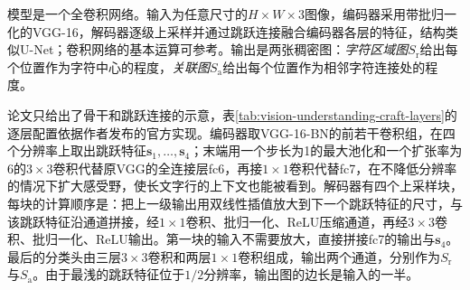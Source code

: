 模型是一个全卷积网络。输入为任意尺寸的$H\times W\times3$图像，编码器采用带批归一化的VGG-16，解码器逐级上采样并通过跳跃连接融合编码器各层的特征，结构类似U-Net；卷积网络的基本运算可参考。输出是两张稠密图：\emph{字符区域图}$S_{\mathrm r}$给出每个位置作为字符中心的程度，\emph{关联图}$S_{\mathrm a}$给出每个位置作为相邻字符连接处的程度。

论文只给出了骨干和跳跃连接的示意，表\ref{tab:vision-understanding-craft-layers}的逐层配置依据作者发布的官方实现。编码器取VGG-16-BN的前若干卷积组，在四个分辨率上取出跳跃特征$\bm s_1,\ldots,\bm s_4$；末端用一个步长为1的最大池化和一个扩张率为6的$3\times3$卷积代替原VGG的全连接层fc6，再接$1\times1$卷积代替fc7，在不降低分辨率的情况下扩大感受野，使长文字行的上下文也能被看到。解码器有四个上采样块，每块的计算顺序是：把上一级输出用双线性插值放大到下一个跳跃特征的尺寸，与该跳跃特征沿通道拼接，经$1\times1$卷积、批归一化、ReLU压缩通道，再经$3\times3$卷积、批归一化、ReLU输出。第一块的输入不需要放大，直接拼接fc7的输出与$\bm s_4$。最后的分类头由三层$3\times3$卷积和两层$1\times1$卷积组成，输出两个通道，分别作为$S_{\mathrm r}$与$S_{\mathrm a}$。由于最浅的跳跃特征位于$1/2$分辨率，输出图的边长是输入的一半。

